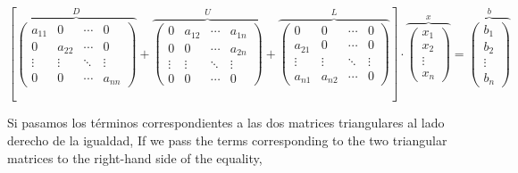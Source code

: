 \begin{equation*}
\left[\overbrace{\begin{pmatrix}
a_{11}& 0& \cdots & 0\\
0& a_{22}& \cdots & 0\\
\vdots & \vdots & \ddots & \vdots\\
0& 0& \cdots & a_{nn}
\end{pmatrix}}^D+
\overbrace{\begin{pmatrix}
0& a_{12}& \cdots & a_{1n}\\
0& 0& \cdots & a_{2n}\\
\vdots & \vdots & \ddots & \vdots\\
0& 0& \cdots & 0
\end{pmatrix}}^U + \overbrace{\begin{pmatrix}
0& 0& \cdots & 0\\
a_{21}& 0& \cdots & 0\\
\vdots & \vdots & \ddots & \vdots\\
a_{n1}& a_{n2}& \cdots & 0
\end{pmatrix}}^L \right]\cdot \overbrace{\begin{pmatrix}
x_1\\
x_2\\
\vdots \\
x_n
\end{pmatrix}}^x=\overbrace{\begin{pmatrix}
b_1\\
b_2\\
\vdots \\
b_n
\end{pmatrix}}^b
\end{equation*}

\begin{paracol}{2}
Si pasamos los términos correspondientes a las dos matrices triangulares al lado derecho de la igualdad,
\switchcolumn
If we pass the terms corresponding to the two triangular matrices to the right-hand side of the equality,
\end{paracol}

